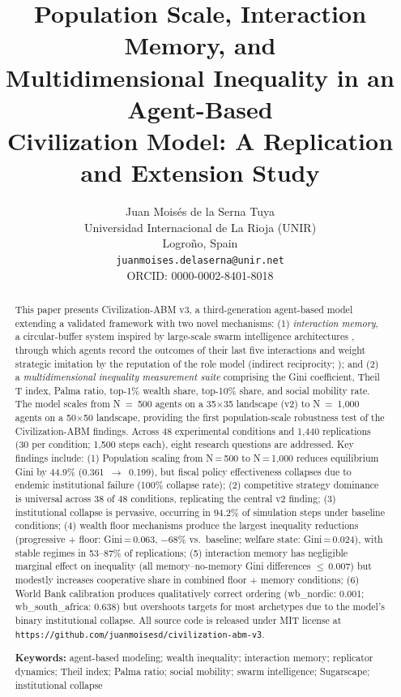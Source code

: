 \documentclass[12pt, letterpaper]{article}
\title{\textbf{Population Scale, Interaction Memory, and\\
Multidimensional Inequality in an Agent-Based\\
Civilization Model: A Replication and Extension Study}}
\author{
  Juan Moisés de la Serna Tuya\\
  Universidad Internacional de La Rioja (UNIR)\\
  Logroño, Spain\\
  \texttt{juanmoises.delaserna@unir.net}\\
  ORCID: 0000-0002-8401-8018
}
\date{}
\begin{document}
\maketitle

\begin{abstract}

This paper presents Civilization-ABM v3, a third-generation agent-based
model extending a validated framework with two novel mechanisms: (1)
\emph{interaction memory}, a circular-buffer system inspired by large-scale
swarm intelligence architectures \citep{mirofish2025, yang2024oasis},
through which agents record the outcomes of their last five interactions
and weight strategic imitation by the reputation of the role model
(indirect reciprocity; \citealp{nowak1998indirect}); and (2) a
\emph{multidimensional inequality measurement suite} comprising the Gini
coefficient, Theil T index, Palma ratio, top-1\% wealth share, top-10\%
share, and social mobility rate. The model scales from N~=~500 agents on
a 35$\times$35 landscape (v2) to N~=~1,000 agents on a 50$\times$50
landscape, providing the first population-scale robustness test of the
Civilization-ABM findings. Across 48 experimental conditions and 1,440
replications (30 per condition; 1,500 steps each), eight research
questions are addressed. Key findings include: (1) Population scaling
from N\,=\,500 to N\,=\,1,000 reduces equilibrium Gini by 44.9\%
(0.361~$\to$~0.199), but fiscal policy effectiveness collapses due to
endemic institutional failure (100\% collapse rate); (2) competitive
strategy dominance is universal across 38 of 48 conditions, replicating
the central v2 finding; (3) institutional collapse is pervasive,
occurring in 94.2\% of simulation steps under baseline conditions;
(4) wealth floor mechanisms produce the largest inequality reductions
(progressive + floor: Gini\,=\,0.063, $-$68\% vs.\ baseline; welfare
state: Gini\,=\,0.024), with stable regimes in 53--87\% of replications;
(5) interaction memory has negligible marginal effect on inequality
(all memory--no-memory Gini differences $\leq$\,0.007) but modestly
increases cooperative share in combined floor + memory conditions;
(6) World Bank calibration produces qualitatively correct ordering
(wb\_nordic: 0.001; wb\_south\_africa: 0.638) but overshoots targets for
most archetypes due to the model's binary institutional collapse.
All source code is released under MIT license at
\texttt{https://github.com/juanmoisesd/civilization-abm-v3}.

\medskip
\noindent\textbf{Keywords:} agent-based modeling; wealth inequality;
interaction memory; replicator dynamics; Theil index; Palma ratio;
social mobility; swarm intelligence; Sugarscape; institutional collapse

\end{abstract}
\end{document}
